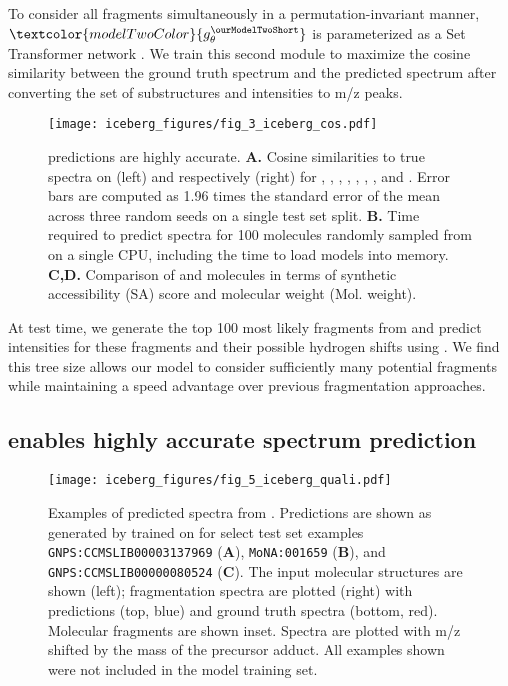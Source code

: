 \documentclass[journal=jcim,manuscript=article]{achemso}
\begin{document}
To consider all fragments simultaneously in a permutation-invariant manner, $\textcolor{modelTwoColor}{g_{\theta}^{\ourModelTwoShort}}$ is parameterized as a Set Transformer  network \cite{Vaswani2017-se, lee2019set}. %
We train this second module to maximize the cosine similarity between the ground truth spectrum and the predicted spectrum after converting the set of substructures and intensities to m/z peaks. 

\begin{figure}[ht]
  \centering
  \texttt{[image: iceberg\_figures/fig\_3\_iceberg\_cos.pdf]}
  \caption{\ourModel predictions are highly accurate. \textbf{A.} Cosine similarities to true spectra on \gnpsData (left) and \nistData respectively (right) for \cfmModel \cite{allen_competitive_2015}, \MolMS \cite{hong20233DMolMS}, \FixedVocab \cite{murphy2023efficiently}, \neimsFFN \cite{wei_rapid_2019}, \neimsGNN \cite{zhu_using_2020}, \Massformer \cite{young_Massformer_2021}, \scarfModel \cite{goldman_prefix-tree_2023}, and \ourModel. Error bars are computed as 1.96 times the standard error of the mean across three random seeds on a single test set split. \textbf{B.} Time required to predict spectra for 100 molecules randomly sampled from \nistData on a single CPU, including the time to load models into memory. \textbf{C,D.} Comparison of \gnpsData and \nistData molecules in terms of synthetic accessibility (SA) score \cite{ertl2009estimation} and molecular weight (Mol. weight).}
  \label{fig:cosine_res}
\end{figure}


At test time, we generate the top 100 most likely fragments from \ourModel \ourModelOneShort and predict intensities for these fragments and their possible hydrogen shifts using \ourModel \ourModelTwoShort. We find this tree size allows our model to consider sufficiently many potential fragments while maintaining a speed advantage over previous fragmentation approaches.

\subsection{\ourModel enables highly accurate spectrum prediction}
\label{sec:spec_results}


\begin{figure}[ht]
  \centering
  \texttt{[image: iceberg\_figures/fig\_5\_iceberg\_quali.pdf]}
  \caption{Examples of predicted spectra from \ourModel. Predictions are shown as generated by \ourModel trained on \gnpsData for select test set examples \texttt{GNPS:CCMSLIB00003137969} (\textbf{A}), \texttt{MoNA:001659} (\textbf{B}),  and \texttt{GNPS:CCMSLIB00000080524} (\textbf{C}).  The input molecular structures are shown (left); fragmentation spectra are plotted (right) with predictions (top, blue) and ground truth spectra (bottom, red). Molecular fragments are shown inset. Spectra are plotted with m/z shifted by the mass of the precursor adduct. All examples shown were not included in the model training set. }
  \label{fig:example_preds}
\end{figure}
\FloatBarrier
\end{document}
